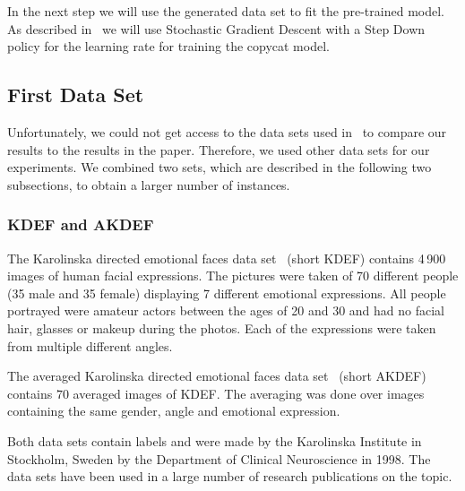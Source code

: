 \documentclass[a4paper,11pt]{article}
\begin{document}
    In the next step we will use the generated data set to fit the pre-trained model.
    As described in~\cite{copycat} we will use Stochastic Gradient Descent with a Step Down policy for the learning rate for training the copycat model. 
    
    \subsection{First Data Set}
        Unfortunately, we could not get access to the data sets used in~\cite{copycat} to compare our results to the results in the paper. Therefore, we used other data sets for our experiments. We combined two sets, which are described in the following two subsections, to obtain a larger number of instances.
        
        \subsubsection{KDEF and AKDEF}
            The Karolinska directed emotional faces data set~\cite{kdef} (short KDEF) contains 4\,900 images of human facial expressions. The pictures were taken of 70 different people (35 male and 35 female) displaying 7 different emotional expressions. All people portrayed were amateur actors between the ages of 20 and 30 and had no facial hair, glasses or makeup during the photos. Each of the expressions were taken from multiple different angles. 
            
            The averaged Karolinska directed emotional faces data set~\cite{kdef} (short AKDEF) contains $70$ averaged images of KDEF. The averaging was done over images containing the same gender, angle and emotional expression.
            
            Both data sets contain labels and were made by the Karolinska Institute in Stockholm, Sweden by the Department of Clinical Neuroscience in 1998. The data sets have been used in a large number of research publications on the topic. 
            
\end{document}
